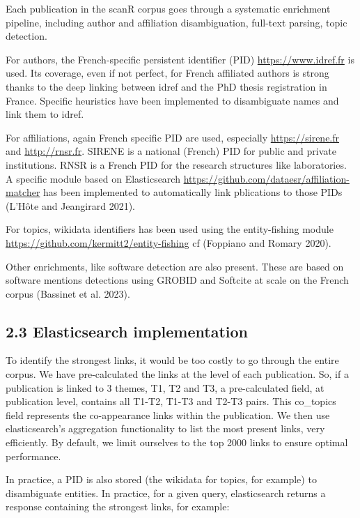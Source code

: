 \documentclass[
]{article}
\begin{document}
Each publication in the scanR corpus goes through a systematic
enrichment pipeline, including author and affiliation disambiguation,
full-text parsing, topic detection.

For authors, the French-specific persistent identifier (PID)
\url{https://www.idref.fr} is used. Its coverage, even if not perfect,
for French affiliated authors is strong thanks to the deep linking
between idref and the PhD thesis registration in France. Specific
heuristics have been implemented to disambiguate names and link them to
idref.

For affiliations, again French specific PID are used, especially
\url{https://sirene.fr} and \url{http://rnsr.fr}. SIRENE is a national
(French) PID for public and private institutions. RNSR is a French PID
for the research structures like laboratories. A specific module based
on Elasticsearch \url{https://github.com/dataesr/affiliation-matcher}
has been implemented to automatically link pblications to those PIDs
(L'Hôte and Jeangirard 2021).

For topics, wikidata identifiers has been used using the entity-fishing
module \url{https://github.com/kermitt2/entity-fishing} cf (Foppiano and
Romary 2020).

Other enrichments, like software detection are also present. These are
based on software mentions detections using GROBID and Softcite at scale
on the French corpus (Bassinet et al. 2023).

\hypertarget{elasticsearch-implementation}{%
\subsection{2.3 Elasticsearch
implementation}\label{elasticsearch-implementation}}

To identify the strongest links, it would be too costly to go through
the entire corpus. We have pre-calculated the links at the level of each
publication. So, if a publication is linked to 3 themes, T1, T2 and T3,
a pre-calculated field, at publication level, contains all T1-T2, T1-T3
and T2-T3 pairs. This co\_topics field represents the co-appearance
links within the publication. We then use elasticsearch's aggregation
functionality to list the most present links, very efficiently. By
default, we limit ourselves to the top 2000 links to ensure optimal
performance.

In practice, a PID is also stored (the wikidata for topics, for example)
to disambiguate entities. In practice, for a given query, elasticsearch
returns a response containing the strongest links, for example:
\end{document}
